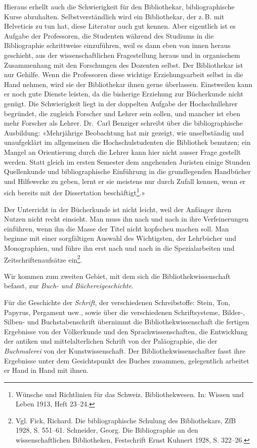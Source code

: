 \documentclass[a4paper,
fontsize=11pt,
oneside,
numbers=noperiodatend,
parskip=half-,
bibliography=totoc,
final
]{scrartcl}
\begin{document}
Hieraus erhellt auch die Schwierigkeit für den Bibliothekar,
bibliographische Kurse abzuhalten. Selbstverständlich wird ein
Bibliothekar, der z.\,B. mit Helveticis zu tun hat, diese Literatur auch
gut kennen. Aber eigentlich ist es Aufgabe der Professoren, die
Studenten während des Studiums in die Bibliographie schrittweise
einzuführen, weil es dann eben von innen heraus geschieht, aus der
wissenschaftlichen Fragestellung heraus und in organischem Zusammenhang
mit den Forschungen des Dozenten selbst. Der Bibliothekar ist nur
Gehilfe. Wenn die Professoren diese wichtige Erziehungsarbeit selbst in
die Hand nehmen, wird sie der Bibliothekar ihnen gerne überlassen.
Einstweilen kann er noch gute Dienste leisten, da die bisherige
Erziehung zur Bücherkunde nicht genügt. Die Schwierigkeit liegt in der
doppelten Aufgabe der Hochschullehrer begründet, die zugleich Forscher
und Lehrer sein sollen, und mancher ist eben mehr Forscher als Lehrer.
Dr.~Carl Benziger schreibt über die bibliographische Ausbildung:
«Mehrjährige Beobachtung hat mir gezeigt, wie unselbständig und
unaufgeklärt im allgemeinen die Hochschulstudenten die Bibliothek
benutzen; ein Mangel an Orientierung durch die Lehrer kann hier nicht
ausser Frage gestellt werden. Statt gleich im ersten Semester dem
angehenden Juristen einige Stunden Quellenkunde und bibliographische
Einführung in die grundlegenden Handbücher und Hilfswerke zu geben,
lernt er sie meistens nur durch Zufall kennen, wenn er sich bereits mit
der Dissertation beschäftigt\footnote{Wünsche und Richtlinien für das
  Schweiz. Bibliothekwesen. In: Wissen und Leben 1913, Heft 23--24.}.»

Der Unterricht in der Bücherkunde ist nicht leicht, weil der Anfänger
ihren Nutzen nicht recht einsieht. Man muss ihn nach und nach in ihre
Verfeinerungen einführen, wenn ihn die Masse der Titel nicht kopfscheu
machen soll. Man beginne mit einer sorgfältigen Auswahl des Wichtigsten,
der Lehrbücher und Monographien, und führe ihn erst nach und nach in die
Spezialarbeiten und Zeitschriftenaufsätze ein\footnote{Vgl. Fick,
  Richard. Die bibliographische Schulung des Bibliothekars, ZfB 1928, S.
  551--61. Schneider, Georg. Die Bibliographie an den wissenschaftlichen
  Bibliotheken, Festschrift Ernst Kuhnert 1928, S. 322--26.}.

Wir kommen zum zweiten Gebiet, mit dem sich die Bibliothekwissenschaft
befasst, zur \emph{Buch- und Büchereigeschichte}.

Für die Geschichte der \emph{Schrift}, der verschiedenen Schreibstoffe:
Stein, Ton, Papyrus, Pergament usw., sowie über die verschiedenen
Schriftsysteme, Bilder-, Silben- und Buchstabenschrift übernimmt die
Bibliothekwissenschaft die fertigen Ergebnisse von der Völkerkunde und
den Sprachwissenschaften, die Entwicklung der antiken und
mittelalterlichen Schrift von der Paläographie, die der
\emph{Buchmalerei} von der Kunstwissenschaft. Der
Bibliothekwissenschafter fasst ihre Ergebnisse unter dem Gesichtspunkt
des Buches zusammen, gelegentlich arbeitet er Hand in Hand mit ihnen.
\end{document}
